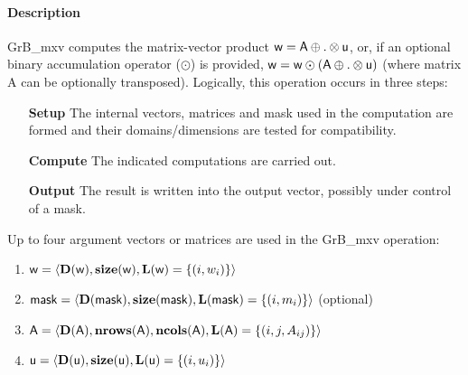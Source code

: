 \paragraph{Description}

{\sf GrB\_mxv} computes the matrix-vector product ${\sf w} = {\sf A}
\oplus . \otimes {\sf u}$, or, if an optional binary accumulation
operator ($\odot$) is provided, ${\sf w} = {\sf w} \odot \left({\sf A}
\oplus . \otimes {\sf u}\right)$ (where matrix {\sf A}
 can be optionally transposed).  Logically, this operation
occurs in three steps:
\begin{enumerate}[leftmargin=0.85in]
\item[\bf Setup] The internal vectors, matrices and mask used in the computation are formed and their domains/dimensions are tested for compatibility.
\item[\bf Compute] The indicated computations are carried out.
\item[\bf Output] The result is written into the output vector, possibly under control of a mask.
\end{enumerate}

Up to four argument vectors or matrices are used in the {\sf GrB\_mxv} operation:
\begin{enumerate}
	\item ${\sf w} = \langle \bold{D}({\sf w}),\bold{size}({\sf w}),\bold{L}({\sf w}) = \{(i,w_i) \} \rangle$
	\item ${\sf mask} = \langle \bold{D}({\sf mask}),\bold{size}({\sf mask}),\bold{L}({\sf mask}) = \{(i,m_i) \} \rangle$ (optional)
	\item ${\sf A} = \langle \bold{D}({\sf A}),\bold{nrows}({\sf A}), \bold{ncols}({\sf A}),\bold{L}({\sf A}) = \{(i,j,A_{ij}) \} \rangle$
	\item ${\sf u} = \langle \bold{D}({\sf u}),\bold{size}({\sf u}),\bold{L}({\sf u}) = \{(i,u_i) \} \rangle$
\end{enumerate}

